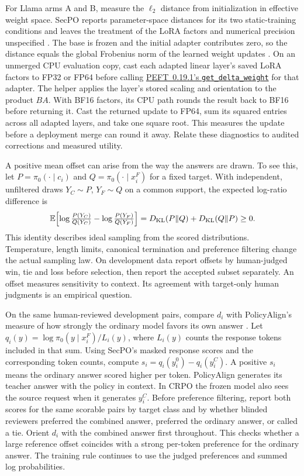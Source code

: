 \documentclass[11pt]{article}
\begin{document}
For Llama arms A and B, measure the $\ell_2$ distance from initialization in effective weight space. SecPO reports parameter-space distances for its two static-training conditions and leaves the treatment of the LoRA factors and numerical precision unspecified \cite[App.~C.1]{chen2026secpo}. The base is frozen and the initial adapter contributes zero, so the distance equals the global Frobenius norm of the learned weight updates \cite[Sec.~2.4]{davion2026drift}. On an unmerged CPU evaluation copy, cast each adapted linear layer's saved LoRA factors to FP32 or FP64 before calling \href{https://github.com/huggingface/peft/blob/ba6a19060d6ab54a87538a6e77e3e4d5a907375b/src/peft/tuners/lora/layer.py#L907-L939}{PEFT~0.19.1's \texttt{get\_delta\_weight}} for that adapter. The helper applies the layer's stored scaling and orientation to the product $BA$. With BF16 factors, its CPU path rounds the result back to BF16 before returning it. Cast the returned update to FP64, sum its squared entries across all adapted layers, and take one square root. This measures the update before a deployment merge can round it away. Relate these diagnostics to audited corrections and measured utility.

A positive mean offset can arise from the way the answers are drawn. To see this, let $P=\pi_0(\cdot\mid c_i)$ and $Q=\pi_0(\cdot\mid x_i^F)$ for a fixed target. With independent, unfiltered draws $Y_C\sim P$, $Y_F\sim Q$ on a common support, the expected log-ratio difference is
\[
\mathbb E\!\left[\log\tfrac{P(Y_C)}{Q(Y_C)}-\log\tfrac{P(Y_F)}{Q(Y_F)}\right]
=D_{\rm KL}(P\Vert Q)+D_{\rm KL}(Q\Vert P)\geq 0.
\]
This identity describes ideal sampling from the scored distributions. Temperature, length limits, canonical termination and preference filtering change the actual sampling law. On development data report offsets by human-judged win, tie and loss before selection, then report the accepted subset separately. An offset measures sensitivity to context. Its agreement with target-only human judgments is an empirical question.

On the same human-reviewed development pairs, compare $d_i$ with PolicyAlign's measure of how strongly the ordinary model favors its own answer \cite[Eq.~5]{wu2026policyalign}. Let $q_i(y)=\log\pi_0(y\mid x_i^F)/L_i(y)$, where $L_i(y)$ counts the response tokens included in that sum. Using SecPO's masked response scores and the corresponding token counts, compute $s_i=q_i(y_i^0)-q_i(y_i^C)$. A positive $s_i$ means the ordinary answer scored higher per token. PolicyAlign generates its teacher answer with the policy in context. In CRPO the frozen model also sees the source request when it generates $y_i^C$. Before preference filtering, report both scores for the same scorable pairs by target class and by whether blinded reviewers preferred the combined answer, preferred the ordinary answer, or called a tie. Orient $d_i$ with the combined answer first throughout. This checks whether a large reference offset coincides with a strong per-token preference for the ordinary answer. The training rule continues to use the judged preferences and summed log probabilities.
\end{document}
